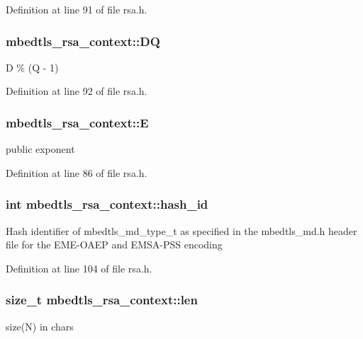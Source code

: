 Definition at line 91 of file rsa.\-h.

\hypertarget{structmbedtls__rsa__context_a753b59e552469b6abb6fad9853a2042d}{
\subsubsection[{D\-Q}]{ mbedtls\-\_\-rsa\-\_\-context\-::\-D\-Q}}\label{structmbedtls__rsa__context_a753b59e552469b6abb6fad9853a2042d}
D \% (Q -\/ 1) 

Definition at line 92 of file rsa.\-h.

\hypertarget{structmbedtls__rsa__context_a7694251c9d4d80f4fe65831be46b0c50}{
\subsubsection[{E}]{ mbedtls\-\_\-rsa\-\_\-context\-::\-E}}\label{structmbedtls__rsa__context_a7694251c9d4d80f4fe65831be46b0c50}
public exponent 

Definition at line 86 of file rsa.\-h.

\hypertarget{structmbedtls__rsa__context_ab220b6999b79d75f2186b2ac67f5267c}{
\subsubsection[{hash\-\_\-id}]{\setlength{\rightskip}{0pt plus 5cm}int mbedtls\-\_\-rsa\-\_\-context\-::hash\-\_\-id}}\label{structmbedtls__rsa__context_ab220b6999b79d75f2186b2ac67f5267c}
Hash identifier of mbedtls\-\_\-md\-\_\-type\-\_\-t as specified in the mbedtls\-\_\-md.\-h header file for the E\-M\-E-\/\-O\-A\-E\-P and E\-M\-S\-A-\/\-P\-S\-S encoding 

Definition at line 104 of file rsa.\-h.

\hypertarget{structmbedtls__rsa__context_a06a537fe6045d6c08d92b2a91461b5d8}{
\subsubsection[{len}]{\setlength{\rightskip}{0pt plus 5cm}size\-\_\-t mbedtls\-\_\-rsa\-\_\-context\-::len}}\label{structmbedtls__rsa__context_a06a537fe6045d6c08d92b2a91461b5d8}
size(\-N) in chars 

